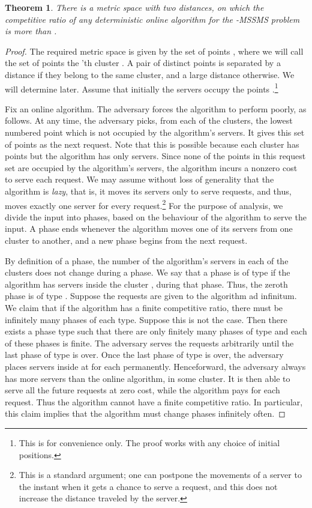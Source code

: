 \documentclass[11pt]{article}
\theoremstyle{plain}\newtheorem{theorem}{Theorem}
\theoremstyle{definition}
\theoremstyle{remark}
\begin{document}
\begin{theorem}\label{thm_lower_bound_online}
There is a metric space with two distances, on which the competitive ratio of any deterministic online algorithm for the -MSSMS problem is more than .
\end{theorem}

\begin{proof}
The required metric space is given by the set of points , where we will call the set of points  the 'th cluster . A pair of distinct points is separated by a distance  if they belong to the same cluster, and a large distance  otherwise. We will determine  later. Assume that initially the servers occupy the points .\footnote{This is for convenience only. The proof works with any choice of initial positions.}

Fix an online algorithm. The adversary forces the algorithm to perform poorly, as follows. At any time, the adversary picks, from each of the  clusters, the lowest numbered point which is not occupied by the algorithm's servers. It gives this set of points as the next request. Note that this is possible because each cluster has  points but the algorithm has only  servers.
Since none of the points in this request set are occupied by the algorithm's servers, the algorithm incurs a nonzero cost to serve each request. We may assume without loss of generality that the algorithm is \textit{lazy}, that is, it moves its servers only to serve requests, and thus, moves exactly one server for every request.\footnote{This is a standard argument; one can postpone the movements of a server to the instant when it gets a chance to serve a request, and this does not increase the distance traveled by the server.} For the purpose of analysis, we divide the input into phases, based on the behaviour of the algorithm to serve the input. 
A phase ends whenever the algorithm moves one of its servers from one cluster to another, and a new phase begins from the next request.

By definition of a phase, the number of the algorithm's servers in each of the  clusters does not change during a phase. We say that a phase is of type  if the algorithm has  servers inside the cluster , during that phase. Thus, the zeroth phase is of type . Suppose the requests are given to the algorithm ad infinitum. We claim that if the algorithm has a finite competitive ratio, there must be infinitely many phases of each type. Suppose this is not the case. Then there exists a phase type  such that there are only finitely many phases of type  and each of these phases is finite. The adversary serves the requests arbitrarily until the last phase of type  is over. Once the last phase of type  is over, the adversary places  servers inside  at  for each  permanently. Henceforward, the adversary always has more servers than the online algorithm, in some cluster. It is then able to serve all the future requests at zero cost, while the algorithm pays for each request. Thus the algorithm cannot have a finite competitive ratio. In particular, this claim implies that the algorithm must change phases infinitely often.


\end{proof}
\end{document}
